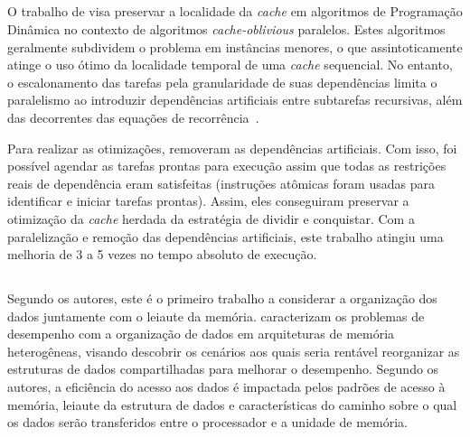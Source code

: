 \subsection{}

O trabalho de  visa preservar a localidade da \textit{cache} em algoritmos de Programação Dinâmica no contexto de algoritmos \textit{cache-oblivious} paralelos.
Estes algoritmos geralmente subdividem o problema em instâncias menores, o que assintoticamente atinge o uso ótimo da localidade temporal de uma \textit{cache} sequencial.
No entanto, o escalonamento das tarefas pela granularidade de suas dependências limita o paralelismo ao introduzir dependências artificiais entre subtarefas recursivas, além das decorrentes das equações de recorrência~\cite{Tang2015}.

Para realizar as otimizações,  removeram as dependências artificiais. Com isso, foi possível agendar as tarefas prontas para execução assim que todas as restrições reais de dependência eram satisfeitas (instruções atômicas foram usadas para identificar e iniciar tarefas prontas). Assim, eles conseguiram preservar a otimização da \textit{cache} herdada da estratégia de dividir e conquistar.
Com a paralelização e remoção das dependências artificiais, este trabalho atingiu uma melhoria de 3 a 5 vezes no tempo absoluto de execução.

\subsection{}


Segundo os autores, este é o primeiro trabalho a considerar a organização dos dados juntamente com o leiaute da memória.
 caracterizam os problemas de desempenho com a organização de dados em arquiteturas de memória heterogêneas, visando descobrir os cenários aos quais seria rentável reorganizar as estruturas de dados compartilhadas para melhorar o desempenho.
Segundo os autores, a eficiência do acesso aos dados é impactada pelos padrões de acesso à memória, leiaute da estrutura de dados e características do caminho sobre o qual os dados serão transferidos entre o processador e a unidade de memória.

